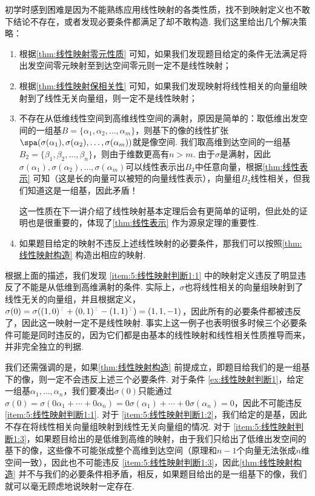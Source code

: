 初学时感到困难是因为不能熟练应用线性映射的各类性质，找不到映射定义也不敢下结论不存在，或者发现必要条件都满足了却不敢构造. 我们这里给出几个解决策略：
\begin{enumerate}
    \item \label{item:5:线性映射判断1:1}
          根据\autoref{thm:线性映射零元性质} 可知，如果我们发现题目给定的条件无法满足将出发空间零元映射至到达空间零元则一定不是线性映射；

    \item \label{item:5:线性映射判断1:2}
          根据\autoref{thm:线性映射保相关性} 可知，如果我们发现映射将线性相关的向量组映射到了线性无关向量组，则一定不是线性映射；

    \item \label{item:5:线性映射判断1:3}
          不存在从低维线性空间到高维线性空间的满射，原因是简单的：取低维出发空间的一组基$B=\{\alpha_1,\alpha_2,\ldots,\alpha_m\}$，则基下的像的线性扩张$\spa(\sigma(\alpha_1),\sigma(\alpha_2),\ldots,\sigma(\alpha_m))$就是像空间. 我们取高维到达空间的一组基$B_2=\{\beta_1,\beta_2,\ldots,\beta_n\}$，则由于维数更高有$n>m$. 由于$\sigma$是满射，因此$\sigma(\alpha_1),\sigma(\alpha_2),\ldots,\sigma(\alpha_m)$可以线性表示出$B_2$中任意向量，根据\autoref{thm:线性表示} 可知（这是长的向量可以被短的向量线性表示），向量组$B_2$线性相关，但我们知道这是一组基，因此矛盾！

          这一性质在下一讲介绍了线性映射基本定理后会有更简单的证明，但此处的证明也是很重要的，体现了\autoref{thm:线性表示} 作为源泉定理的重要性.

    \item 如果题目给定的映射不违反上述线性映射的必要条件，那我们可以按照\autoref{thm:线性映射构造} 构造出相应的映射.
\end{enumerate}

根据上面的描述，我们发现 \ref*{item:5:线性映射判断1:1} 中的映射定义违反了明显违反了不能是从低维到高维满射的条件. 实际上，$\sigma$也将线性相关的向量组映射到了线性无关的向量组，并且根据定义，$\sigma(0)=\sigma((1,0)^{\color{lightgray}\mathrm{T}}+(0,1)^{\color{lightgray}\mathrm{T}}-(1,1)^{\color{lightgray}\mathrm{T}})=(1,1,-1)$，因此所有的必要条件都被违反了，因此这一映射一定不是线性映射. 事实上这一例子也表明很多时候三个必要条件可能是同时违反的，因为它们都是由基本的线性映射和线性相关性质推导而来，并非完全独立的判据.

我们还需强调的是，如果\autoref{thm:线性映射构造} 前提成立，即题目给我们的是一组基下的像，则一定不会违反上述三个必要条件. 对于条件 \ref*{ex:线性映射判断1}，给定一组基$\alpha_1,\ldots,\alpha_n$，我们要凑出$\sigma(0)$只能通过$\sigma(0)=\sigma(0\alpha_1+\cdots+0\alpha_n)=0\sigma(\alpha_1)+\cdots+0\sigma(\alpha_n)=0$，因此不可能违反  \ref*{item:5:线性映射判断1:1}. 对于 \ref*{item:5:线性映射判断1:2}，我们给定的是基，因此不存在将线性相关向量组映射到线性无关向量组的情况. 对于 \ref*{item:5:线性映射判断1:3}，如果题目给出的是低维到高维的映射，由于我们只给出了低维出发空间的基下的像，这些像不可能张成整个高维到达空间（原理和$n-1$个向量无法张成$n$维空间一致），因此也不可能违反 \ref*{item:5:线性映射判断1:3}，因此\autoref{thm:线性映射构造} 并不与我们的必要条件相矛盾，相反，如果题目给出的是一组基下的像，我们就可以毫无顾虑地说映射一定存在.

